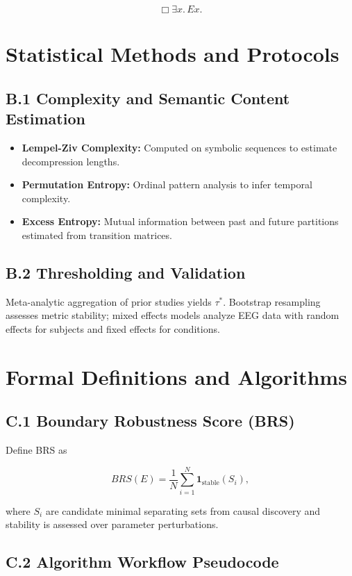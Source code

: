 \documentclass[12pt,a4paper]{article}
\begin{document}
\[
\Box \exists x.\, Ex.
\]

\section{Statistical Methods and Protocols}

\subsection{B.1 Complexity and Semantic Content Estimation}

\begin{itemize}
    \item \textbf{Lempel-Ziv Complexity:} Computed on symbolic sequences to estimate decompression lengths.
    \item \textbf{Permutation Entropy:} Ordinal pattern analysis to infer temporal complexity.
    \item \textbf{Excess Entropy:} Mutual information between past and future partitions estimated from transition matrices.
\end{itemize}

\subsection{B.2 Thresholding and Validation}

Meta-analytic aggregation of prior studies yields $\tau^{*}$. Bootstrap resampling assesses metric stability; mixed effects models analyze EEG data with random effects for subjects and fixed effects for conditions.

\section{Formal Definitions and Algorithms}

\subsection{C.1 Boundary Robustness Score (BRS)}

Define BRS as

\[
BRS(E) = \frac{1}{N} \sum_{i=1}^N \mathbf{1}_{\text{stable}}(S_i),
\]

where $S_i$ are candidate minimal separating sets from causal discovery and stability is assessed over parameter perturbations.

\subsection{C.2 Algorithm Workflow Pseudocode}
\end{document}
